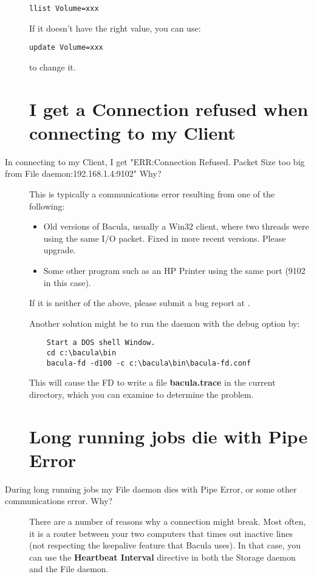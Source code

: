 \begin{description}
\footnotesize
\begin{verbatim}
llist Volume=xxx
\end{verbatim}
\normalsize

If it doesn't have the right value, you can use:

\footnotesize
\begin{verbatim}
update Volume=xxx
\end{verbatim}
\normalsize

to change it.

\label{ConnectionRefused}
\section{I get a Connection refused when connecting to my Client}
\item [In connecting to my Client, I get "ERR:Connection Refused.  Packet
   Size too big from File daemon:192.168.1.4:9102" Why?]
   This is typically a communications error resulting  from one of the
   following:


\begin{itemize}
\item Old versions of Bacula, usually a Win32 client, where two  threads were
   using the same I/O packet. Fixed in more recent  versions. Please upgrade.
\item Some other program such as an HP Printer using the same  port (9102 in
   this case).
\end{itemize}

If it is neither of the above, please submit a bug report at
.

Another solution might be to run the daemon with the debug  option by:

\footnotesize
\begin{verbatim}
    Start a DOS shell Window.
    cd c:\bacula\bin
    bacula-fd -d100 -c c:\bacula\bin\bacula-fd.conf

\end{verbatim}
\normalsize

This will cause the FD to write a file {\bf bacula.trace}  in the current
directory, which you can examine to determine  the problem.

\section{Long running jobs die with Pipe Error}
\item [During long running jobs my File daemon dies with Pipe Error, or
       some other communications error. Why?]
   There are a number of reasons why a connection might break.
   Most often, it is a router between your two computers that times out
   inactive lines (not respecting the keepalive feature that Bacula uses).
   In that case, you can use the {\bf Heartbeat Interval} directive in
   both the Storage daemon and the File daemon.


\end{description}
